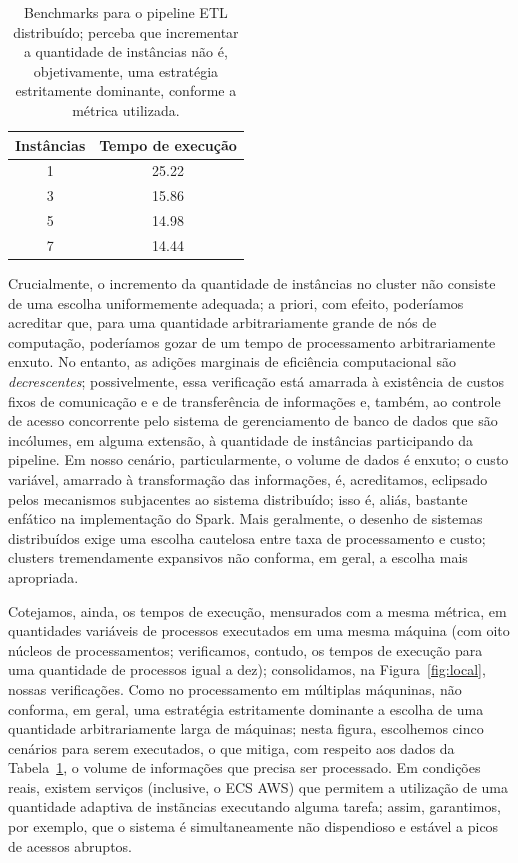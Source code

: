 \documentclass[12pt,oneside,a4paper]{article}
\begin{document}
\begin{table} 
	\centering 
	\begin{tabular}{c | c} 
		Instâncias & Tempo de execução \\
		\hline 
		1 & 25.22 \\ 
		3 & 15.86 \\ 
		5 & 14.98 \\ 
		7 & 14.44 \\ 
		\hline 
	\end{tabular}
	\caption{Benchmarks para o pipeline ETL distribuído; perceba que incrementar a quantidade de instâncias não é, objetivamente, uma estratégia estritamente dominante, conforme a métrica utilizada.} 
	\label{tab:benchmarks} 
\end{table} 

Crucialmente, o incremento da quantidade de instâncias no cluster não consiste de uma escolha uniformemente adequada; a priori, com efeito, poderíamos acreditar que, para uma quantidade arbitrariamente grande de nós de computação, poderíamos gozar de um tempo de processamento arbitrariamente enxuto. No entanto, as adições marginais de eficiência computacional são \textit{decrescentes}; possivelmente, essa verificação está amarrada à existência de custos fixos de comunicação e e de transferência de informações e, também, ao controle de acesso concorrente pelo sistema de gerenciamento de banco de dados que são incólumes, em alguma extensão, à quantidade de instâncias participando da pipeline. Em nosso cenário, particularmente, o volume de dados é enxuto; o custo variável, amarrado à transformação das informações, é, acreditamos, eclipsado pelos mecanismos subjacentes ao sistema distribuído; isso é, aliás, bastante enfático na implementação do Spark. Mais geralmente, o desenho de sistemas distribuídos exige uma escolha cautelosa entre taxa de processamento e custo; clusters tremendamente expansivos não conforma, em geral, a escolha mais apropriada. 

Cotejamos, ainda, os tempos de execução, mensurados com a mesma métrica, em quantidades variáveis de processos executados em uma mesma máquina (com oito núcleos de processamentos; verificamos, contudo, os tempos de execução para uma quantidade de processos igual a dez); consolidamos, na Figura~\ref{fig:local}, nossas verificações. Como no processamento em múltiplas máquninas, não conforma, em geral, uma estratégia estritamente dominante a escolha de uma quantidade arbitrariamente larga de máquinas; nesta figura, escolhemos cinco cenários para serem executados, o que mitiga, com respeito aos dados da Tabela~\ref{tab:benchmarks}, o volume de informações que precisa ser processado. Em condições reais, existem serviços (inclusive, o ECS AWS) que permitem a utilização de uma quantidade adaptiva de instãncias executando alguma tarefa; assim, garantimos, por exemplo, que o sistema é simultaneamente não dispendioso e estável a picos de acessos abruptos. 
\end{document}
